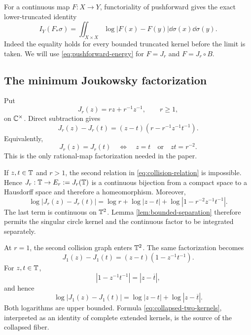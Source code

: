 For a continuous map \(F:X\to Y\), functoriality of pushforward gives
the exact lower-truncated identity
\begin{equation}\label{eq:pushforward-energy}
 I_Y(F_\ast\sigma)
 =\iint_{X\times X}\log|F(x)-F(y)|
   \dd\sigma(x)\dd\sigma(y).
\end{equation}
Indeed the equality holds for every bounded truncated kernel before the
limit is taken.  We will use \eqref{eq:pushforward-energy} for
\(F=J_r\) and \(F=J_r\circ B\).

\subsection{The minimum Joukowsky factorization}

Put
\[
 J_r(z)=rz+r^{-1}z^{-1},\qquad r\geq1,
\]
on \(\mathbb{C}^\times\).  Direct subtraction gives
\begin{equation}\label{eq:boundary-factorization}
 J_r(z)-J_r(t)
 =(z-t)\left(r-r^{-1}z^{-1}t^{-1}\right).
\end{equation}
Equivalently,
\begin{equation}\label{eq:collision-relation}
 J_r(z)=J_r(t)
 \quad\Longleftrightarrow\quad
 z=t\quad\text{or}\quad zt=r^{-2}.
\end{equation}
This is the only rational-map factorization needed in the paper.

If \(z,t\in\mathbb{T}\) and \(r>1\), the second relation in
\eqref{eq:collision-relation} is impossible.  Hence
\(J_r:\mathbb{T}\to E_r:=J_r(\mathbb{T})\) is a continuous bijection from a compact
space to a Hausdorff space and therefore a homeomorphism.  Moreover,
\begin{equation}\label{eq:elliptic-kernel-split}
 \log|J_r(z)-J_r(t)|
 =\log r+\log|z-t|
  +\log|1-r^{-2}z^{-1}t^{-1}|.
\end{equation}
The last term is continuous on \(\mathbb{T}^2\).  Lemma
\ref{lem:bounded-separation} therefore permits the singular circle
kernel and the continuous factor to be integrated separately.

At \(r=1\), the second collision graph enters \(\mathbb{T}^2\).  The same
factorization becomes
\begin{equation}\label{eq:collapsed-kernel-split}
 J_1(z)-J_1(t)=(z-t)(1-z^{-1}t^{-1}).
\end{equation}
For \(z,t\in\mathbb{T}\),
\[
 |1-z^{-1}t^{-1}|=|z-\overline t|,
\]
and hence
\begin{equation}\label{eq:collapsed-two-kernels}
 \log|J_1(z)-J_1(t)|
 =\log|z-t|+\log|z-\overline t|.
\end{equation}
Both logarithms are upper bounded.  Formula
\eqref{eq:collapsed-two-kernels}, interpreted as an identity of complete
extended kernels, is the source of the collapsed fiber.


